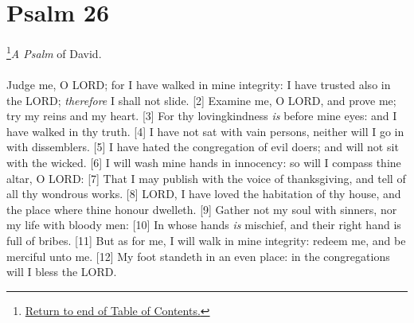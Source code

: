 \chapter{Psalm 26}





\footnote{\textcolor[rgb]{0.00,0.25,0.00}{\hyperlink{TOC}{Return to end of Table of Contents.}}}\textcolor[cmyk]{0.99998,1,0,0}{\emph{A Psalm} of David.}\\
\\
\textcolor[cmyk]{0.99998,1,0,0}{Judge me, O LORD; for I have walked in mine integrity: I have trusted also in the LORD; \emph{therefore} I shall not slide.}
[2] \textcolor[cmyk]{0.99998,1,0,0}{Examine me, O LORD, and prove me; try my reins and my heart.}
[3] \textcolor[cmyk]{0.99998,1,0,0}{For thy lovingkindness \emph{is} before mine eyes: and I have walked in thy truth.}
[4] \textcolor[cmyk]{0.99998,1,0,0}{I have not sat with vain persons, neither will I go in with dissemblers.}
[5] \textcolor[cmyk]{0.99998,1,0,0}{I have hated the congregation of evil doers; and will not sit with the wicked.}
[6] \textcolor[cmyk]{0.99998,1,0,0}{I will wash mine hands in innocency: so will I compass thine altar, O LORD:}
[7] \textcolor[cmyk]{0.99998,1,0,0}{That I may publish with the voice of thanksgiving, and tell of all thy wondrous works.}
[8] \textcolor[cmyk]{0.99998,1,0,0}{LORD, I have loved the habitation of thy house, and the place where thine honour dwelleth.}
[9] \textcolor[cmyk]{0.99998,1,0,0}{Gather not my soul with sinners, nor my life with bloody men:}
[10] \textcolor[cmyk]{0.99998,1,0,0}{In whose hands \emph{is} mischief, and their right hand is full of bribes.}
[11] \textcolor[cmyk]{0.99998,1,0,0}{But as for me, I will walk in mine integrity: redeem me, and be merciful unto me.}
[12] \textcolor[cmyk]{0.99998,1,0,0}{My foot standeth in an even place: in the congregations will I bless the LORD.}